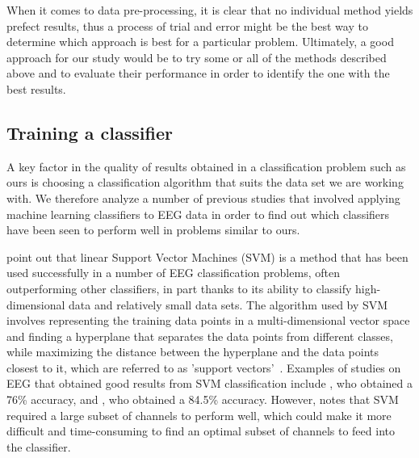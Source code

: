 \documentclass{mprop}
\begin{document}
When it comes to data pre-processing, it is clear that no individual method yields prefect results, thus a process of trial and error might be the best way to determine which approach is best for a particular problem. Ultimately, a good approach for our study would be to try some or all of the methods described above and to evaluate their performance in order to identify the one with the best results.
 
\subsection{Training a classifier}

A key factor in the quality of results obtained in a classification problem such as ours is choosing a classification algorithm that suits the data set we are working with. We therefore analyze a number of previous studies that involved applying machine learning classifiers to EEG data in order to find out which classifiers have been seen to perform well in problems similar to ours.

\citet{lotte_review_2007} point out that linear Support Vector Machines (SVM) is a method that has been used successfully in a number of EEG classification problems, often outperforming other classifiers, in part thanks to its ability to classify high-dimensional data and relatively small data sets. The algorithm used by SVM involves representing the training data points in a multi-dimensional vector space and finding a hyperplane that separates the data points from different classes, while maximizing the distance between the hyperplane and the data points closest to it, which are referred to as 'support vectors'~\cite{gandhi_support_2018}. Examples of studies on EEG that obtained good results from SVM classification include \citet{vuckovic_prediction_2018}, who obtained a 76\% accuracy, and \citet{kaper_bci_2004}, who obtained a 84.5\% accuracy. However, \citet{gallardo_transferable_2017} notes that SVM required a large subset of channels to perform well, which could make it more difficult and time-consuming to find an optimal subset of channels to feed into the classifier.
\end{document}
